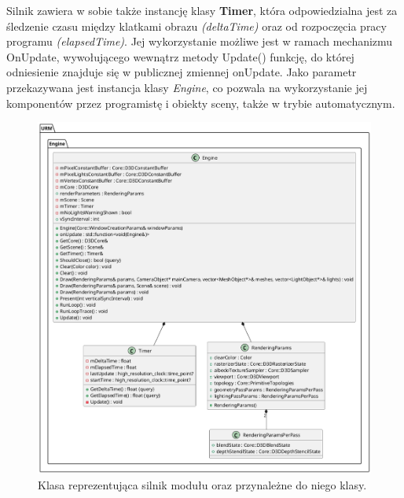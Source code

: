 	Silnik zawiera w sobie także instancję klasy \textbf{Timer}, która odpowiedzialna jest za śledzenie czasu między klatkami obrazu \textit{(deltaTime)} oraz od rozpoczęcia pracy programu \textit{(elapsedTime)}. Jej wykorzystanie możliwe jest w ramach mechanizmu OnUpdate, wywołującego wewnątrz metody Update() funkcję, do której odniesienie znajduje się w publicznej zmiennej onUpdate. Jako parametr przekazywana jest instancja klasy \textit{Engine}, co pozwala na wykorzystanie jej komponentów przez programistę i obiekty sceny, także w trybie automatycznym.
	
	\begin{figure}[h!]
		\centering
		\includegraphics[width=\textwidth]{images/UML/engine.png}
		\caption{Klasa reprezentująca silnik modułu oraz przynależne do niego klasy.}
		\label{UML_Engine}
	\end{figure}
